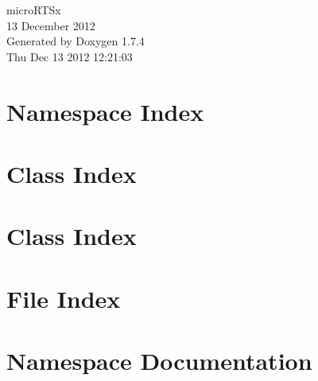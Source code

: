\documentclass[a4paper]{book}
\begin{document}
\hypersetup{pageanchor=false}
\begin{titlepage}
\vspace*{7cm}
\begin{center}
{\Large microRTSx \\[1ex]\large 13 December 2012 }\\
\vspace*{1cm}
{\large Generated by Doxygen 1.7.4}\\
\vspace*{0.5cm}
{\small Thu Dec 13 2012 12:21:03}\\
\end{center}
\end{titlepage}
\clearemptydoublepage
{}
\tableofcontents
\clearemptydoublepage
{}
\hypersetup{pageanchor=true}
\chapter{Namespace Index}

\chapter{Class Index}

\chapter{Class Index}

\chapter{File Index}

\chapter{Namespace Documentation}










\end{document}

